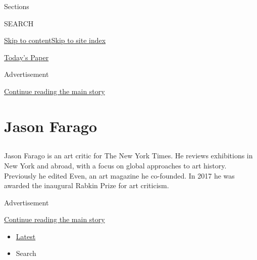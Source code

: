 Sections

SEARCH

\protect\hyperlink{site-content}{Skip to
content}\protect\hyperlink{site-index}{Skip to site index}

\href{https://myaccount.nytimes.com/auth/login?response_type=cookie\&client_id=vi}{}

\href{https://www.nytimes.com/section/todayspaper}{Today's Paper}

Advertisement

\protect\hyperlink{after-top}{Continue reading the main story}

\hypertarget{jason-farago}{%
\section{Jason Farago}\label{jason-farago}}

\subsection{}

Jason Farago is an art critic for The New York Times. He reviews
exhibitions in New York and abroad, with a focus on global approaches to
art history. Previously he edited Even, an art magazine he co-founded.
In 2017 he was awarded the inaugural Rabkin Prize for art criticism.

Advertisement

\protect\hyperlink{after-mid1}{Continue reading the main story}

\begin{itemize}
\tightlist
\item
  \protect\hyperlink{stream-panel}{Latest}
\item
  Search
\end{itemize}

